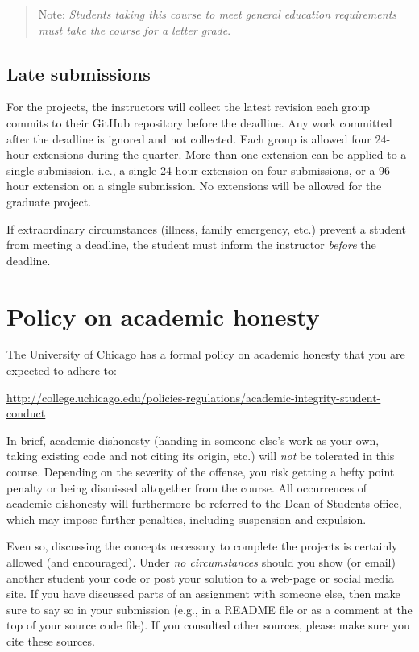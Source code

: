 \documentclass[11pt]{article}
\begin{document}
\begin{quote}
Note: \emph{Students taking this course to meet general education requirements must take the course for a letter grade}. 
\end{quote}


\subsection{Late submissions}

For the projects, the instructors will collect the latest revision each group commits to their GitHub repository before the deadline. Any work committed after the deadline is ignored and not collected. Each group is allowed four 24-hour extensions during the quarter. More than one extension can be applied to a single submission. i.e., a single 24-hour extension on four submissions, or a 96-hour extension on a single submission. No extensions will be allowed for the graduate project.

If extraordinary circumstances (illness, family emergency, etc.) prevent a student from meeting a deadline, the student must inform the instructor \emph{before} the deadline.


\section{Policy on academic honesty}

The University of Chicago has a formal policy on academic honesty that you are expected to adhere to:

\begin{center}
\url{http://college.uchicago.edu/policies-regulations/academic-integrity-student-conduct}
\end{center}

In brief, academic dishonesty (handing in someone else's work as your own, taking existing code and not citing its origin, etc.) will \emph{not} be tolerated in this course. Depending on the severity of the offense, you risk getting a hefty point penalty or being dismissed altogether from the course. All occurrences of academic dishonesty will furthermore be referred to the Dean of Students office, which may impose further penalties, including suspension and expulsion.

Even so, discussing the concepts necessary to complete the projects is certainly allowed (and encouraged).  Under \emph{no circumstances} should you show (or email) another student your code or post your solution to a web-page or social media site.  If you have discussed parts of an assignment with someone else, then make sure to say so in your submission (e.g., in a README file or as a comment at the top of your source code file). If you consulted other sources, please make sure you cite these sources.
\end{document}

